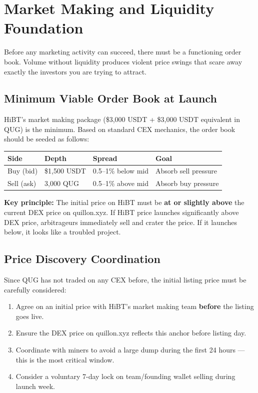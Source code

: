 \documentclass[11pt,a4paper]{article}
\begin{document}
\section{Market Making and Liquidity Foundation}

Before any marketing activity can succeed, there must be a functioning order book. Volume without liquidity produces violent price swings that scare away exactly the investors you are trying to attract.

\subsection{Minimum Viable Order Book at Launch}

HiBT's market making package (\$3,000 USDT + \$3,000 USDT equivalent in QUG) is the minimum. Based on standard CEX mechanics, the order book should be seeded as follows:

\begin{center}
\begin{tabular}{C{2.5cm} C{2.5cm} C{2.5cm} C{2.5cm}}
  \toprule
  \textbf{Side} & \textbf{Depth} & \textbf{Spread} & \textbf{Goal} \\
  \midrule
  Buy (bid) & \$1,500 USDT & 0.5--1\% below mid & Absorb sell pressure \\
  Sell (ask) & 3,000 QUG & 0.5--1\% above mid & Absorb buy pressure \\
  \bottomrule
\end{tabular}
\end{center}

\textbf{Key principle:} The initial price on HiBT must be \textbf{at or slightly above} the current DEX price on quillon.xyz. If HiBT price launches significantly above DEX price, arbitrageurs immediately sell and crater the price. If it launches below, it looks like a troubled project.

\subsection{Price Discovery Coordination}

Since QUG has not traded on any CEX before, the initial listing price must be carefully considered:

\begin{enumerate}[leftmargin=1.5em]
  \item Agree on an initial price with HiBT's market making team \textbf{before} the listing goes live.
  \item Ensure the DEX price on quillon.xyz reflects this anchor before listing day.
  \item Coordinate with miners to avoid a large dump during the first 24 hours — this is the most critical window.
  \item Consider a voluntary 7-day lock on team/founding wallet selling during launch week.
\end{enumerate}
\end{document}
